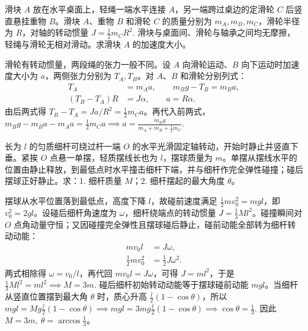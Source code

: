 \documentclass[lang=cn,11pt]{elegantbook}
\begin{document}
\begin{exercise}
滑块 \(A\) 放在水平桌面上，轻绳一端水平连接 \(A\)，另一端跨过桌边的定滑轮 \(C\) 后竖直悬挂重物 \(B\)。滑块 \(A\)、重物 \(B\) 和滑轮 \(C\) 的质量分别为 \(m_A,m_B,m_C\)，滑轮半径为 \(R\)，对轴的转动惯量
 \(J=\frac12m_CR^2.\) 
滑块与桌面间、滑轮与轴承之间均无摩擦，轻绳与滑轮无相对滑动。求滑块 \(A\) 的加速度大小。
\end{exercise}

\begin{solution}
滑轮有转动惯量，两段绳的张力一般不同。设 \(A\) 向滑轮运动、\(B\) 向下运动时加速度大小为 \(a\)，两侧张力分别为 \(T_A,T_B\)。对 \(A\)、\(B\) 和滑轮分别列式：
\[
\begin{aligned}
T_A&=m_Aa,\qquad m_Bg-T_B=m_Ba,\\
(T_B-T_A)R&=J\alpha,\qquad a=R\alpha.
\end{aligned}
\]
由后两式得 \(T_B-T_A=Ja/R^2=\frac12m_Ca\)。再代入前两式，
 \(m_Bg-m_Ba-m_Aa=\frac12m_Ca \implies a=\frac{m_Bg}{m_A+m_B+\frac12m_C}.\) 
\end{solution}

\begin{exercise}
长为 \(l\) 的匀质细杆可绕过杆一端 \(O\) 的水平光滑固定轴转动，开始时静止并竖直下垂。紧挨 \(O\) 点悬一单摆，轻质摆线长也为 \(l\)，摆球质量为 \(m\)。单摆从摆线水平的位置由静止释放，到最低点时水平撞击细杆下端，并与细杆作完全弹性碰撞；碰后摆球正好静止。求：1. 细杆质量 \(M\)；2. 细杆摆起的最大角度 \(\theta\)。
\end{exercise}

\begin{solution}
摆球从水平位置落到最低点，高度下降 \(l\)，故碰前速度满足 \(\frac12mv_0^2=mgl\)，即 \(v_0^2=2gl\)。设碰后细杆角速度为 \(\omega\)，细杆绕端点的转动惯量 \(J=\frac13Ml^2\)。碰撞瞬间对 \(O\) 点角动量守恒；又因碰撞完全弹性且摆球碰后静止，碰前动能全部转为细杆转动动能：
\[
\begin{aligned}
mv_0l&=J\omega,\\
\frac12mv_0^2&=\frac12J\omega^2.
\end{aligned}
\]
两式相除得 \(\omega=v_0/l\)，再代回 \(mv_0l=J\omega\)，可得 \(J=ml^2\)，于是
 \(\frac13Ml^2=ml^2 \implies M=3m.\) 
碰后细杆初始转动动能等于摆球碰前动能 \(mgl\)。当细杆从竖直位置摆到最大角 \(\theta\) 时，质心升高 \(\frac{l}{2}(1-\cos\theta)\)，所以
 \(mgl=Mg\frac{l}{2}(1-\cos\theta) \implies mgl=3mg\frac{l}{2}(1-\cos\theta) \implies \cos\theta=\frac13.\) 
因此 \(M=3m,\ \theta=\arccos\frac13\)。
\end{solution}
\end{document}
